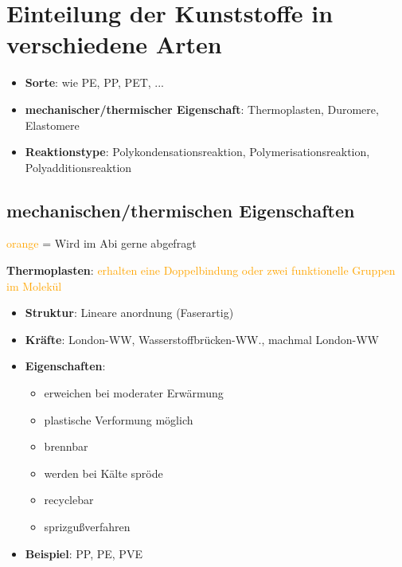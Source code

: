 \section{Einteilung der Kunststoffe in verschiedene Arten}

\begin{itemize}
    \item \textbf{Sorte}: wie PE, PP, PET, ...
    \item \textbf{mechanischer/thermischer Eigenschaft}: Thermoplasten, Duromere, Elastomere
    \item \textbf{Reaktionstype}: Polykondensationsreaktion, Polymerisationsreaktion, Polyadditionsreaktion
\end{itemize}

\subsection{mechanischen/thermischen Eigenschaften}

\vspace{0.3cm}
\textcolor{orange}{orange} = Wird im Abi gerne abgefragt
\vspace{0.3cm}

\textbf{Thermoplasten}: \textcolor{orange}{erhalten eine Doppelbindung oder zwei funktionelle Gruppen im Molekül}
\begin{itemize}
    \item \textbf{Struktur}: Lineare anordnung (Faserartig)
    \item \textbf{Kräfte}: London-WW, Wasserstoffbrücken-WW., machmal London-WW
    \item \textbf{Eigenschaften}:
        \begin{itemize}
            \item erweichen bei moderater Erwärmung
            \item plastische Verformung möglich
            \item brennbar
            \item werden bei Kälte spröde
            \item recyclebar
            \item sprizgußverfahren
        \end{itemize}
    \item \textbf{Beispiel}: PP, PE, PVE
\end{itemize}

